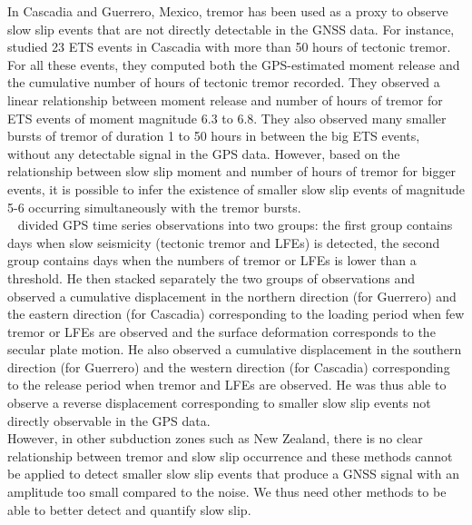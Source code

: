 \documentclass{article}
\begin{document}
In Cascadia and Guerrero, Mexico, tremor has been used as a proxy to observe slow slip events that are not directly detectable in the GNSS data. For instance, ~\citet{AGU_2009} studied 23 ETS events in Cascadia with more than 50 hours of tectonic tremor. For all these events, they computed both the GPS-estimated moment release and the cumulative number of hours of tectonic tremor recorded. They observed a linear relationship between moment release and number of hours of tremor for ETS events of moment magnitude 6.3 to 6.8. They also observed many smaller bursts of tremor of duration 1 to 50 hours in between the big ETS events, without any detectable signal in the GPS data. However, based on the relationship between slow slip moment and number of hours of tremor for bigger events, it is possible to infer the existence of smaller slow slip events of magnitude 5-6 occurring simultaneously with the tremor bursts. \\ %

~\citet{FRA_2016} divided GPS time series observations into two groups: the first group contains days when slow seismicity (tectonic tremor and LFEs) is detected, the second group contains days when the numbers of tremor or LFEs is lower than a threshold. He then stacked separately the two groups of observations and observed a cumulative displacement in the northern direction (for Guerrero) and the eastern direction (for Cascadia) corresponding to the loading period when few tremor or LFEs are observed and the surface deformation corresponds to the secular plate motion. He also observed a cumulative displacement in the southern direction (for Guerrero) and the western direction (for Cascadia) corresponding to the release period when tremor and LFEs are observed. He was thus able to observe a reverse displacement corresponding to smaller slow slip events not directly observable in the GPS data. \\

However, in other subduction zones such as New Zealand, there is no clear relationship between tremor and slow slip occurrence and these methods cannot be applied to detect smaller slow slip events that produce a GNSS signal with an amplitude too small compared to the noise. We thus need other methods to be able to better detect and quantify slow slip. \\
\end{document}
